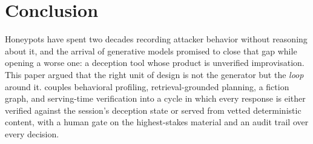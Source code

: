 \section{Conclusion}
\label{sec:conclusion}

Honeypots have spent two decades recording attacker behavior without
reasoning about it, and the arrival of generative models promised to close
that gap while opening a worse one: a deception tool whose product is
unverified improvisation. This paper argued that the right unit of design
is not the generator but the \emph{loop} around it. \system couples
behavioral profiling, retrieval-grounded planning, a fiction graph, and
serving-time verification into a cycle in which every response is either
verified against the session's deception state or served from vetted
deterministic content, with a human gate on the highest-stakes material
and an audit trail over every decision.

